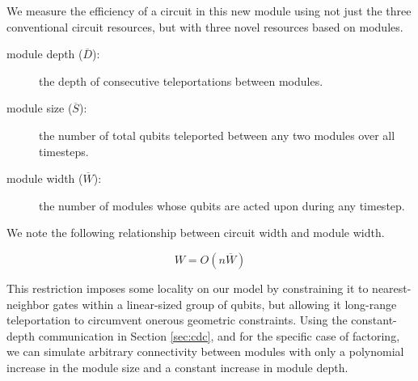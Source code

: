 We measure the efficiency of a circuit in this new module using not just
the three conventional circuit resources, but with three novel resources
based on modules.

\begin{description}

\item[module depth ($\overline{D}$):] the depth of consecutive teleportations between modules.
\item[module size ($\overline{S}$):] the number of total qubits teleported between any two modules over all timesteps.
\item[module width ($\overline{W}$):] the number of modules whose qubits are
acted upon during any timestep.

\end{description}



We note the following relationship between circuit width and
module width.

\begin{equation}
W = O(n\overline{W})
\label{eqn:module-width}
\end{equation}

This restriction imposes some locality on our model by constraining it to
nearest-neighbor gates within a linear-sized group of qubits, but allowing
it long-range teleportation to circumvent onerous geometric constraints.
Using the constant-depth communication in Section \ref{sec:cdc}, and for
the specific case of factoring, we
can simulate arbitrary connectivity between modules with only a polynomial
increase in the module size and a constant increase in module depth.
